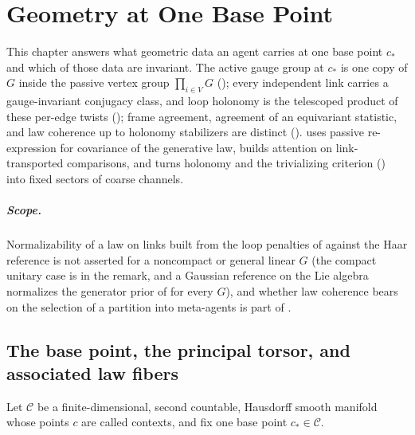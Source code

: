\chapter{Geometry at One Base Point}
\label{ch:geometry}

This chapter answers what geometric data an agent carries at one base point $c_*$ and which of those
data are invariant. The active gauge group at $c_*$ is one copy of $G$ inside the passive vertex group
$\prod_{i\in V}G$ (); every independent link carries a
gauge-invariant conjugacy class, and loop holonomy is the telescoped product of these per-edge twists
(); frame agreement, agreement of an equivariant statistic, and
law coherence up to holonomy stabilizers are distinct ().
 uses passive re-expression for covariance of the generative law,
 builds attention on link-transported comparisons, and
 turns holonomy and the trivializing criterion
() into fixed sectors of coarse channels.

\paragraph{Scope.}
Normalizability of a law on links built from the loop penalties of  against
the Haar reference is not asserted for a noncompact or general linear $G$ (the compact unitary case is in
the remark, and a Gaussian reference on the Lie algebra normalizes the generator prior of
 for every $G$), and
whether law coherence bears on the selection of a partition into meta-agents is part of
. 

\section{The base point, the principal torsor, and associated law fibers}
\label{sec:geo-base}
\label{sec:geo-bundle}
\label{sec:geo-associated}

Let $\mathcal C$ be a finite-dimensional, second countable, Hausdorff smooth manifold whose points
$c$ are called contexts, and fix one base point $c_*\in\mathcal C$.

